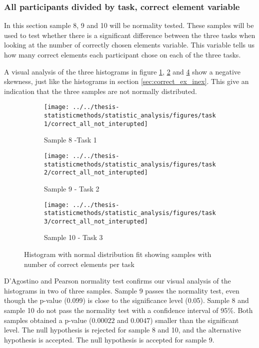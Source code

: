  \subsubsection[Sample 8, 9 and 10]{All participants divided by task,  correct element variable}\label{sec:task123_correct_normaltest}
 In this section sample 8, 9 and 10 will be normality tested. These samples will be used to test whether there is a significant difference between the three tasks when looking at the number of correctly chosen elements variable. This variable tells us how many correct elements each participant chose on each of the three tasks. 

A visual analysis of the three histograms in figure \ref{fig:correctallnotinterupted_task1}, \ref{fig:correctallnotinterupted_task2} and \ref{fig:correctallnotinterupted_task3} show a negative skewness, just like the histograms in section \ref{sec:correct_ex_inex}. This give an indication that the three samples are not normally distributed. 
 
 \begin{figure}[H]
 	\centering
	 \begin{subfigure}[b]{0.3\textwidth}
	 	\centering
	 	\texttt{[image: ../../thesis-statisticmethods/statistic\_analysis/figures/task1/correct\_all\_not\_interupted]}
	 	\caption{Sample 8 -Task 1}
	 	\label{fig:correctallnotinterupted_task1}
	 \end{subfigure}
	\begin{subfigure}[b]{0.3\textwidth}
		\centering
		\texttt{[image: ../../thesis-statisticmethods/statistic\_analysis/figures/task2/correct\_all\_not\_interupted]}
		\caption{Sample 9 - Task 2}
		\label{fig:correctallnotinterupted_task2}
	\end{subfigure}
	 \begin{subfigure}[b]{0.3\textwidth}
	 	\centering
	 	\texttt{[image: ../../thesis-statisticmethods/statistic\_analysis/figures/task3/correct\_all\_not\_interupted]}
	 	\caption{Sample 10 - Task 3}
	 	\label{fig:correctallnotinterupted_task3}
	 \end{subfigure}
 \caption{Histogram with normal distribution fit showing samples with number of correct elements per task}
 \end{figure}
 
 D'Agostino and Pearson normality test confirms our visual analysis of the histograms in two of three samples. Sample 9 passes the normality test, even though the p-value (0.099) is close to the significance level (0.05). Sample 8 and sample 10 do not pass the normality test with a confidence interval of 95\%. Both samples obtained a p-value ($0.00022$ and $0.0047$) smaller than the significant level. The null hypothesis is rejected for sample 8 and 10, and the alternative hypothesis is accepted. The null hypothesis is accepted for sample 9. \\[0.2cm]

